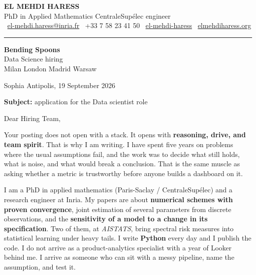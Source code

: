 \documentclass[10pt,a4paper]{article}
\begin{document}
{\headingfont\bfseries\fontsize{20}{23}\selectfont EL MEHDI HARESS}\\[0.7ex]
{\headingfont\fontsize{10.5}{13}\selectfont\color{accent}%
PhD in Applied Mathematics \textbar{} CentraleSupélec engineer}\\[1.0ex]
{\small
\faEnvelope[regular]~\href{mailto:el-mehdi.haress@inria.fr}{el-mehdi.haress@inria.fr}\quad
\faPhone*~+33 7 58 23 41 50\quad
\faLinkedin~\href{https://www.linkedin.com/in/el-mehdi-haress-67750b3aa/}{el-mehdi-haress}\quad
\faGlobe~\href{https://elmehdiharess.org}{elmehdiharess.org}
}

\vspace{0.4ex}
{\color{rulegray}\rule{\linewidth}{0.7pt}}

\vspace{1.2ex}

\begin{minipage}[t]{0.52\textwidth}
\vspace{0pt}\raggedright\small
\textbf{Bending Spoons}\\
Data Science hiring\\
Milan \textemdash{} London \textemdash{} Madrid \textemdash{} Warsaw
\end{minipage}\hfill
\begin{minipage}[t]{0.42\textwidth}
\vspace{0pt}\raggedleft\small
Sophia Antipolis, 19 September 2026
\end{minipage}

\vspace{2.0ex}

{\small\textbf{Subject:} application for the Data scientist role}

\vspace{1.8ex}

Dear Hiring Team,

Your posting does not open with a stack. It opens with \textbf{reasoning, drive, and team spirit}. That is why I am writing. I have spent five years on problems where the usual assumptions fail, and the work was to decide what still holds, what is noise, and what would break a conclusion. That is the same muscle as asking whether a metric is trustworthy before anyone builds a dashboard on it.

I am a PhD in applied mathematics (Paris-Saclay / CentraleSupélec) and a research engineer at Inria. My papers are about \textbf{numerical schemes with proven convergence}, joint estimation of several parameters from discrete observations, and the \textbf{sensitivity of a model to a change in its specification}. Two of them, at \emph{AISTATS}, bring spectral risk measures into statistical learning under heavy tails. I write \textbf{Python} every day and I publish the code. I do not arrive as a product-analytics specialist with a year of Looker behind me. I arrive as someone who can sit with a messy pipeline, name the assumption, and test it.
\end{document}
